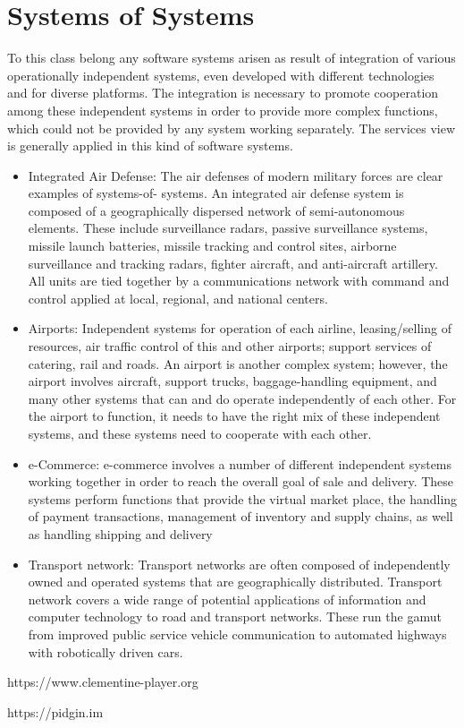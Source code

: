\chapter{Systems of Systems}\label{ch:SoS}
To this class belong any software systems arisen as result of integration of various operationally independent systems, even developed with different technologies and for diverse platforms. The integration is necessary to promote cooperation among these independent systems in order to provide more complex functions, which could not be provided by any system working separately. The services view is generally applied in this kind of software systems.
\begin{itemize}                                           	
\item Integrated Air Defense: The air defenses of modern military forces are
clear examples of systems-of- systems. An integrated air defense system is composed of a geographically dispersed network of semi-autonomous elements. These include surveillance radars, passive surveillance systems, missile launch batteries, missile tracking and control sites, airborne surveillance and tracking radars, fighter aircraft, and anti-aircraft artillery. All units are tied together by a communications network with command and control applied at local, regional, and national centers.
 
\item Airports: Independent systems for operation of each airline,
leasing/selling of resources, air traffic control of this and other airports; support services of catering, rail and roads. An airport is another complex system; however, the airport involves aircraft, support trucks, baggage-handling equipment, and many other systems that can and do operate independently of each other. For the airport to function, it needs to have the right mix of these independent systems, and these systems need to cooperate with each other.
 
\item e-Commerce: e-commerce involves a number of different independent systems
working together in order to reach the overall goal of sale and delivery. These systems perform functions that provide the virtual market place, the handling of payment transactions, management of inventory and supply chains, as well as handling shipping and delivery
                                            	
\item Transport network: Transport networks are often composed of independently
owned and operated systems that are geographically distributed.  Transport network covers a wide range of potential applications of information and computer technology to road and transport networks. These run the gamut from improved public service vehicle communication to automated highways with robotically driven cars.
\end{itemize}


https://www.clementine-player.org

https://pidgin.im
